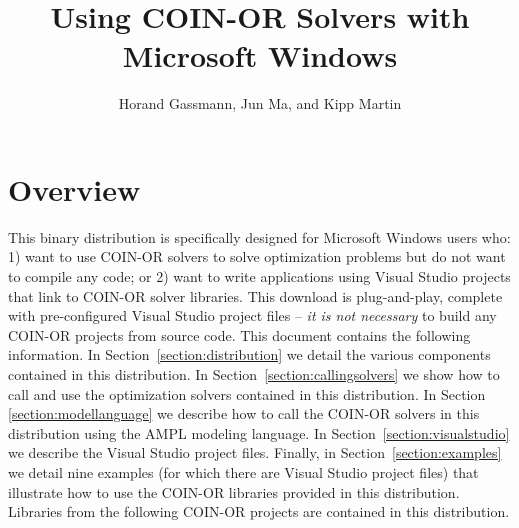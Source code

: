\documentclass[11pt]{article}
\renewcommand{\{}{{\char"7B}}
\renewcommand{\}}{{\char"7D}}
\renewcommand{\^}{{\char"0D}}
\renewcommand{\'}{{\char"0D}}
\begin{document}
\title{Using COIN-OR Solvers with Microsoft Windows}
\vskip 2in
\author{Horand Gassmann, Jun Ma,  and  Kipp Martin}
\maketitle

\iffalse
\begin{abstract}
This document describes a special binary distribution of executables, libraries and code connected 
to the COIN-OR Optimization Services (OS) project. It is intended for users of Microsoft Windows who
want to use COIN-OR solvers to solve optimization problems without the need to compile any code or 
want to write applications using Visual Studio projects that link to COIN-OR solver libraries.  
We detail the use of these binaries with several examples and give code snippets for further insight. 
We also explain how the examples can be built in Microsoft Visual Studio 
using {\tt .vcproj} files that are provided as part of the distribution.

\end{abstract}

\newpage
\fi

\section{Overview}\label{section:overview}
This binary distribution is specifically designed for Microsoft Windows users who: 
1) want to use COIN-OR solvers to solve optimization problems but do not want to compile any code; 
or 2) want to write applications using Visual Studio projects that link to COIN-OR solver libraries.  
This download is plug-and-play, complete with pre-configured Visual Studio project 
files -- {\it it is not necessary} to build any COIN-OR projects from source code.  
This document contains the following information. In Section~\ref{section:distribution} we
detail the various components contained in this distribution. In Section~\ref{section:callingsolvers}  
we show how to call and use the optimization solvers contained in this distribution.  
In Section \ref{section:modellanguage} we describe how to call the COIN-OR solvers 
in this distribution using the AMPL modeling language. In Section~\ref{section:visualstudio} 
we describe the Visual Studio project files.  Finally, in Section~\ref{section:examples} 
we detail nine examples (for which there are Visual Studio project files) that illustrate 
how to use the COIN-OR libraries provided in this distribution.  Libraries from the following 
COIN-OR projects are contained in this distribution.
\end{document}
